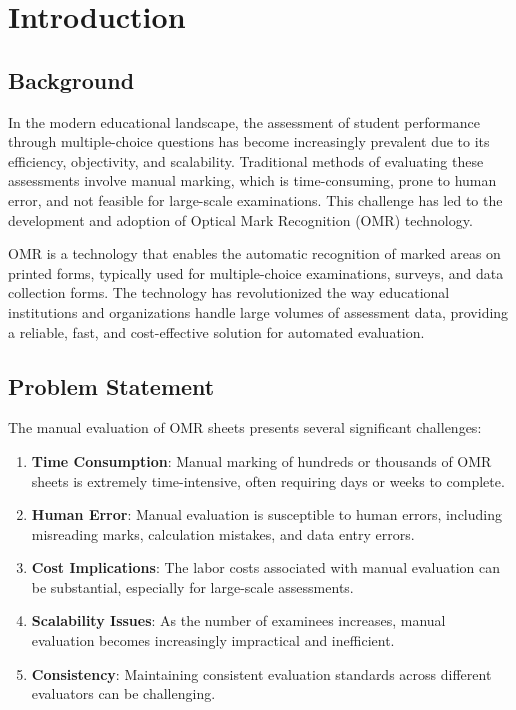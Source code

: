 \chapter{Introduction}
\label{ch:introduction}

\section{Background}

In the modern educational landscape, the assessment of student performance through multiple-choice questions has become increasingly prevalent due to its efficiency, objectivity, and scalability. Traditional methods of evaluating these assessments involve manual marking, which is time-consuming, prone to human error, and not feasible for large-scale examinations. This challenge has led to the development and adoption of Optical Mark Recognition (OMR) technology.

OMR is a technology that enables the automatic recognition of marked areas on printed forms, typically used for multiple-choice examinations, surveys, and data collection forms. The technology has revolutionized the way educational institutions and organizations handle large volumes of assessment data, providing a reliable, fast, and cost-effective solution for automated evaluation.

\section{Problem Statement}

The manual evaluation of OMR sheets presents several significant challenges:

\begin{enumerate}
\item \textbf{Time Consumption}: Manual marking of hundreds or thousands of OMR sheets is extremely time-intensive, often requiring days or weeks to complete.
\item \textbf{Human Error}: Manual evaluation is susceptible to human errors, including misreading marks, calculation mistakes, and data entry errors.
\item \textbf{Cost Implications}: The labor costs associated with manual evaluation can be substantial, especially for large-scale assessments.
\item \textbf{Scalability Issues}: As the number of examinees increases, manual evaluation becomes increasingly impractical and inefficient.
\item \textbf{Consistency}: Maintaining consistent evaluation standards across different evaluators can be challenging.
\end{enumerate}

